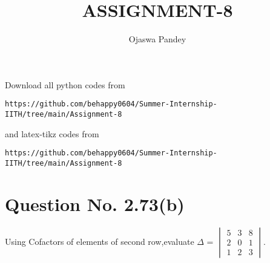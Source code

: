 \documentclass[journal,12pt,twocolumn]{IEEEtran}
\begin{document}
     \def\topbox#1{\raisebox{-\baselineskip}[0in][0in]{#1}}
     \def\midbox#1{\raisebox{-0.5\baselineskip}[0in][0in]{#1}}
\vspace{3cm}
\title{ASSIGNMENT-8}
\author{Ojaswa Pandey}
\maketitle
\newpage
\bigskip
\renewcommand{\thefigure}{\theenumi}
\renewcommand{\thetable}{\theenumi}
Download all python codes from 
\begin{lstlisting}
https://github.com/behappy0604/Summer-Internship-IITH/tree/main/Assignment-8
\end{lstlisting}
%
and latex-tikz codes from 
%
\begin{lstlisting}
https://github.com/behappy0604/Summer-Internship-IITH/tree/main/Assignment-8
\end{lstlisting}
%
\section{Question No. 2.73(b)} 
Using Cofactors of elements of second row,evaluate $\Delta$ =
$\begin{vmatrix} 5&3&8 \\ 2&0&1 \\ 1&2&3 \end{vmatrix}.$
\end{document}
